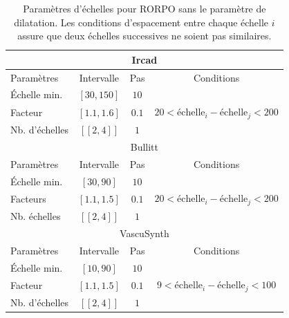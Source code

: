 \begin{table}[H]
  \caption{ Paramètres d'échelles pour RORPO sans le paramètre de dilatation. Les conditions d'espacement entre chaque échelle $i$ assure que deux échelles successives ne soient pas similaires.}
  \label{tab:SS_interval_RORPO}
  \begin{center}
    \begin{tabular}{  l  c  c  c }
      \hline
      \multicolumn{4}{c}{Ircad}\\
      \hline
      Paramètres & Intervalle & Pas & Conditions \\
      \hline
      Échelle min. & $[30,150]$ & $10$ & \\
      Facteur & $[1.1,1.6]$ & $0.1$ & $20 < \textrm{échelle}_{i} - \textrm{échelle}_{j} < 200$ \\ 
      Nb. d'échelles & $[\![2,4]\!]$ & $1$ & \\
      \hline
      \hline
      \multicolumn{4}{c}{Bullitt}\\
      \hline
      Paramètres & Intervalle & Pas & Conditions \\
      \hline
      Échelle min. & $[30,90]$ & $10$ & \\
      
      Facteurs & $[1.1,1.5]$  & $0.1$ & $ 20 < \textrm{échelle}_{i} - \textrm{échelle}_{j} < 200$ \\
      Nb. échelles & $[\![2,4]\!]$ & $1$ & \\
      \hline
      \hline
      \multicolumn{4}{c}{VascuSynth}\\
      \hline
      Paramètres & Intervalle & Pas & Conditions \\
      \hline
      Échelle min. & $[10,90]$ & $10$ & \\
      
      Facteur & $[1.1,1.5]$  &  $0.1$ & $ 9 < \textrm{échelle}_{i} - \textrm{échelle}_{j} < 100$ \\
      
      Nb. d'échelles & $[\![2,4]\!]$ & $1$ & \\
      \hline
    \end{tabular}
  \end{center}
\end{table}

